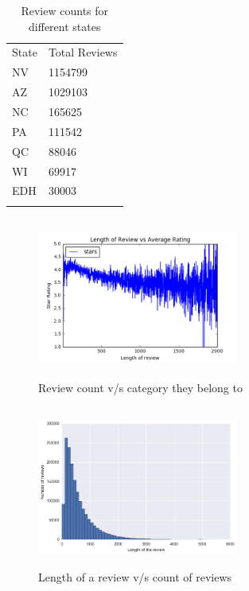 \documentclass[paper=a4, fontsize=11pt]{scrartcl} %
\numberwithin{equation}{section} %
\numberwithin{figure}{section} %
\numberwithin{table}{section} %
\begin{document}
\begin{table}[!htb]
 \centering
 \caption{Review counts for different states}
 \label{state_review}
 \begin{tabular}{l l} 
    \noalign{\smallskip}\hline\noalign{\smallskip}
    State & Total Reviews \\
    \noalign{\smallskip}\hline\noalign{\smallskip}
NV & 1154799 \\
AZ & 1029103 \\
NC & 165625 \\
PA & 111542 \\
QC & 88046 \\
WI & 69917 \\
EDH & 30003 \\
    \noalign{\smallskip}\hline
  \end{tabular} 
\end{table}  

\begin{figure}[!htb]
\centering
\includegraphics[width=250px, height = 200px]{avg_count.png}
\caption{Review count v/s category they belong to}
\label{average_length}
\end{figure} 

\begin{figure}[!htb]
\centering
\includegraphics[width=250px, height = 200px]{len_count.png}
\caption{Length of a review v/s count of reviews}
\label{length_count}
\end{figure} 
\end{document}
